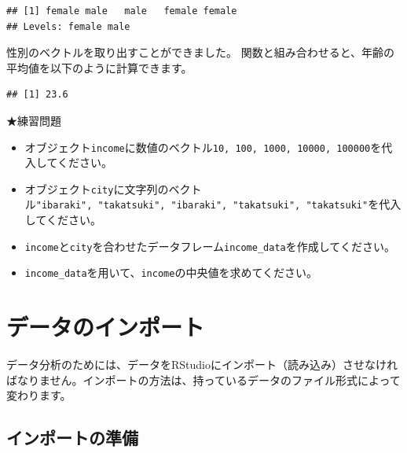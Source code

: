 \documentclass[]{book}
\newenvironment{Shaded}{\begin{snugshade}}{\end{snugshade}}
\newcommand{\KeywordTok}[1]{\textcolor[rgb]{0.13,0.29,0.53}{\textbf{#1}}}
\newcommand{\OperatorTok}[1]{\textcolor[rgb]{0.81,0.36,0.00}{\textbf{#1}}}
\newcommand{\NormalTok}[1]{#1}
\providecommand{\tightlist}{%
  \setlength{\itemsep}{0pt}\setlength{\parskip}{0pt}}
\begin{document}
\begin{Shaded}
\end{Shaded}

\begin{verbatim}
## [1] female male   male   female female
## Levels: female male
\end{verbatim}

性別のベクトルを取り出すことができました。
関数と組み合わせると、年齢の平均値を以下のように計算できます。

\begin{Shaded}
\end{Shaded}

\begin{verbatim}
## [1] 23.6
\end{verbatim}

★練習問題

\begin{itemize}
\tightlist
\item
  オブジェクト\texttt{income}に数値のベクトル\texttt{10,\ 100,\ 1000,\ 10000,\ 100000}を代入してください。
\item
  オブジェクト\texttt{city}に文字列のベクトル\texttt{"ibaraki",\ "takatsuki",\ "ibaraki",\ "takatsuki",\ "takatsuki"}を代入してください。
\item
  \texttt{income}と\texttt{city}を合わせたデータフレーム\texttt{income\_data}を作成してください。
\item
  \texttt{income\_data}を用いて、\texttt{income}の中央値を求めてください。
\end{itemize}

\chapter{データのインポート}\label{ImportData}

データ分析のためには、データをRStudioにインポート（読み込み）させなければなりません。インポートの方法は、持っているデータのファイル形式によって変わります。

\section{インポートの準備}\label{ux30a4ux30f3ux30ddux30fcux30c8ux306eux6e96ux5099}
\end{document}
